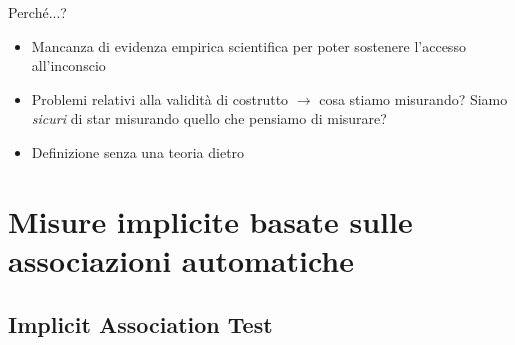 \documentclass[compress]{beamer}
\begin{document}
\begin{frame}{Perché...?}
	\begin{itemize}
		\item Mancanza di evidenza empirica scientifica per poter sostenere l'accesso all'inconscio 
		\item Problemi relativi alla validità di costrutto $\rightarrow$ cosa stiamo misurando? Siamo \emph{sicuri} di star misurando quello che pensiamo di misurare?  
		\item Definizione senza una teoria dietro 
	\end{itemize}
\end{frame}

\section[Associazioni automatiche]{Misure implicite basate sulle associazioni automatiche}

\subsection{Implicit Association Test}

%	
%	
\end{document}
